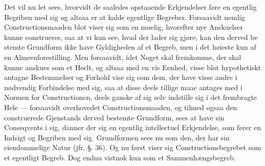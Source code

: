 \documentclass[12pt]{book}
\makeatletter
\def\textit#1{#1}%
\def\emph#1{#1}%
\newcommand{\umph}[2][misc]{%
  \@ifundefined{umph@#1@on}{#2}{\emph{#2}}}
\newcommand{\opage}[1]{\marginnote{\footnotesize\textit{[#1]}}}
\makeatother
\begin{document}
Det vil nu let sees, hvorvidt de saaledes opstaaende Erkjendelser føre en egentlig
Begriben med sig og altsaa er at kalde egentlige Begreber. Forsaavidt nemlig
Constructionsmaaden blot viser sig som en muelig, hvorefter nye Anskuelser \emph{kunne
construeres}, saa at vi kun see, hvad der \emph{lader sig gjøre}, kan den derved be%
\opage{164}stemte Grundform ikke have Gyldigheden af et Begreb, men i det høieste kun af en
Almeenforestilling. Men forsaavidt, idet Noget skal fremkomme, der skal kunne anskues
som et Heelt, og altsaa med en vis Eenhed, visse blot hypothetiskt antagne
Bestemmelser og Forhold vise sig som dem, der have visse andre i nødvendig Forbindelse
med sig, saa at disse deels tillige maae antages med i Normen for Constructionen, deels
ganske af sig selv indstille sig i det frembragte Hele --- forsaavidt overhovedet
Constructionsmaaden, og tilmed ogsaa den construerede Gjenstands derved bestemte
Grundform, sees at have sin Conseqvents i sig, danner der sig en egentlig
\emph{intellectuel Erkjendelse}, som fører en Indsigt og Begriben med sig. Grundformen
sees nu som den, der har sin eiendommelige \emph{Natur} (jfr. §. 36). Og nu først viser
sig Constructionsbegrebet som et egentligt Begreb. Dog endnu vistnok kun som et
Sammenhængsbegreb.
\end{document}
